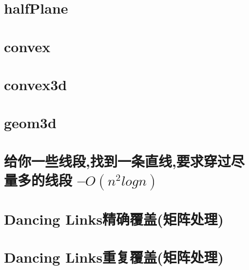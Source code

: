 \documentclass[
	10pt,
	twocolumn,
	a4paper,
]{article}
\begin{document}
\section{halfPlane}

\section{convex}

\section{convex3d}

\section{geom3d}

\section{给你一些线段,找到一条直线,要求穿过尽量多的线段 –$O(n^2logn)$}


%
\section{Dancing Links精确覆盖(矩阵处理)}

\section{Dancing Links重复覆盖(矩阵处理)}

%
\end{document}
